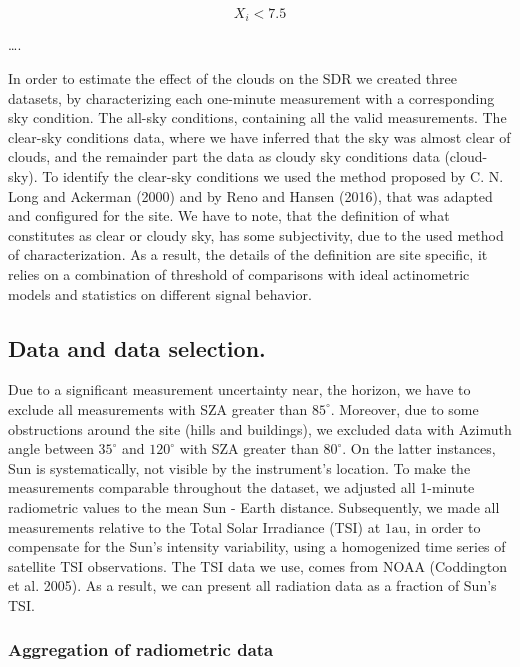 \documentclass[
  preprint, 3p, authoryear]{article}
\begin{document}
\begin{equation}
X_i < 7.5
\label{eq:VSMcr}
\end{equation}

\ldots.

In order to estimate the effect of the clouds on the SDR we created three datasets, by characterizing each one-minute measurement with a corresponding sky condition.
The all-sky conditions, containing all the valid measurements.
The clear-sky conditions data, where we have inferred that the sky was almost clear of clouds, and the remainder part the data as cloudy sky conditions data (cloud-sky).
To identify the clear-sky conditions we used the method proposed by C. N. Long and Ackerman (2000) and by Reno and Hansen (2016), that was adapted and configured for the site.
We have to note, that the definition of what constitutes as clear or cloudy sky, has some subjectivity, due to the used method of characterization.
As a result, the details of the definition are site specific, it relies on a combination of threshold of comparisons with ideal actinometric models and statistics on different signal behavior.

\hypertarget{data-and-data-selection.}{%
\subsection{Data and data selection.}\label{data-and-data-selection.}}

Due to a significant measurement uncertainty near, the horizon, we have to exclude
all measurements with SZA greater than \(85^\circ\).
Moreover, due to some obstructions around the site (hills and buildings), we excluded data with Azimuth angle between
\(35^\circ\) and \(120^\circ\) with SZA greater than \(80^\circ\).
On the latter instances, Sun is systematically, not visible by the instrument's location.
To make the measurements comparable throughout the dataset, we adjusted all 1-minute radiometric values to the mean Sun - Earth distance.
Subsequently, we made all measurements relative to the Total Solar Irradiance (TSI) at \(1 \text{au}\), in order to compensate for the Sun's intensity variability, using a homogenized time series of satellite TSI observations.
The TSI data we use, comes from NOAA (Coddington et al. 2005).
As a result, we can present all radiation data as a fraction of Sun's TSI.

\hypertarget{aggregation-of-radiometric-data}{%
\subsubsection{Aggregation of radiometric data}\label{aggregation-of-radiometric-data}}
\end{document}
